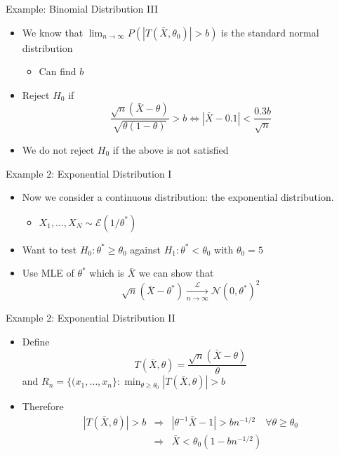 \documentclass{beamer}
\begin{document}
\begin{frame}{Example: Binomial Distribution III} 
\begin{itemize} 
 \item We know that $\lim_{n \rightarrow \infty} P(|T(\bar{X}, \theta_0)| > b) $ is the standard normal distribution
 \begin{itemize}
 \item Can find $b$ 
 \end{itemize} 
 \item Reject $H_0$ if 
 \begin{displaymath} 
 \frac{\sqrt{n}(\bar{X} - \theta)}{\sqrt{\theta(1- \theta)}} > b \Leftrightarrow |\bar{X} - 0.1| < \frac{0.3b}{\sqrt{n}} 
 \end{displaymath}
\item We do not reject $H_0$ if the above is not satisfied 
\end{itemize}
\end{frame}

\begin{frame}{Example 2: Exponential Distribution I}  
\begin{itemize} 
 \item Now we consider a continuous distribution: the exponential distribution. 
\begin{itemize} 
\item $X_1, \ldots, X_N \sim  \mathcal{E}(1/\theta^*)$ 
\end{itemize}
\item Want to test $H_0: \theta^* \geq \theta_0$ against $H_1: \theta^* < \theta_0$ with $\theta_0 = 5$ 
\item Use MLE of $\theta^*$ which is $\bar{X}$ we can show that 
\begin{displaymath} 
 \sqrt{n}(\bar{X} - \theta^*) \xrightarrow[n \rightarrow \infty]{\mathcal{L}} \mathcal{N}(0, \theta^*)^2
\end{displaymath}
\end{itemize}
\end{frame}

\begin{frame}{Example 2: Exponential Distribution II} 
\begin{itemize}
 \item Define 
\begin{displaymath} 
T(\bar{X}, \theta) = \frac{\sqrt{n}(\bar{X} - \theta)}{\theta}
\end{displaymath}
and $R_n = \{(x_1, \ldots, x_n\} : \min_{\theta \geq \theta_0} |T(\bar{X}, \theta) | > b$ 
\item Therefore 
\begin{eqnarray*} 
|T(\bar{X}, \theta) | > b &\Rightarrow& |\theta^{-1} \bar{X} - 1| > bn^{-1/2} \quad \forall \theta \geq \theta_0 \\ 
&\Rightarrow& \bar{X} < \theta_0(1 - bn^{-1/2})  \\ 
\end{eqnarray*}
\end{itemize}
\end{frame}
\end{document}
